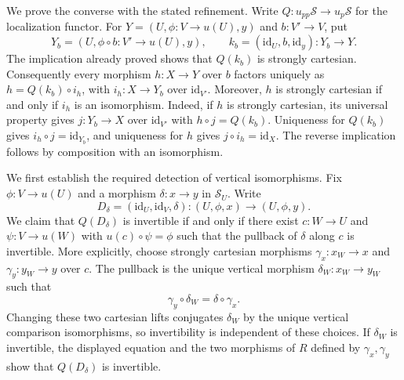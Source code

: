 We prove the converse with the stated refinement. Write
$Q : u_{pp}\mathcal{S} \to u_p\mathcal{S}$ for the localization functor.
For $Y = (U, \phi : V \to u(U), y)$ and $b : V' \to V$, put
$$
Y_b = (U, \phi \circ b : V' \to u(U), y),\qquad
k_b = (\text{id}_U, b, \text{id}_y) : Y_b \to Y.
$$
The implication already proved shows that $Q(k_b)$ is strongly cartesian.
Consequently every morphism $h : X \to Y$ over $b$ factors uniquely as
$h = Q(k_b) \circ i_h$, with $i_h : X \to Y_b$ over $\text{id}_{V'}$.
Moreover, $h$ is strongly cartesian if and only if $i_h$ is an isomorphism.
Indeed, if $h$ is strongly cartesian, its universal property gives
$j : Y_b \to X$ over $\text{id}_{V'}$ with $h \circ j = Q(k_b)$.
Uniqueness for $Q(k_b)$ gives $i_h \circ j = \text{id}_{Y_b}$, and
uniqueness for $h$ gives $j \circ i_h = \text{id}_X$.
The reverse implication follows by composition with an isomorphism.

\medskip\noindent
We first establish the required detection of vertical isomorphisms.
Fix $\phi : V \to u(U)$ and a morphism $\delta : x \to y$ in
$\mathcal{S}_U$. Write
$$
D_\delta = (\text{id}_U, \text{id}_V, \delta) :
(U,\phi,x) \longrightarrow (U,\phi,y).
$$
We claim that $Q(D_\delta)$ is invertible if and only if there exist
$c : W \to U$ and $\psi : V \to u(W)$ with $u(c) \circ \psi = \phi$
such that the pullback of $\delta$ along $c$ is invertible.
More explicitly, choose strongly cartesian morphisms
$\gamma_x : x_W \to x$ and $\gamma_y : y_W \to y$ over $c$.
The pullback is the unique vertical morphism $\delta_W : x_W \to y_W$
such that
$$
\gamma_y \circ \delta_W = \delta \circ \gamma_x.
$$
Changing these two cartesian lifts conjugates $\delta_W$ by the unique
vertical comparison isomorphisms, so invertibility is independent of
these choices. If $\delta_W$ is invertible, the displayed equation and
the two morphisms of $R$ defined by $\gamma_x,\gamma_y$ show that
$Q(D_\delta)$ is invertible.

